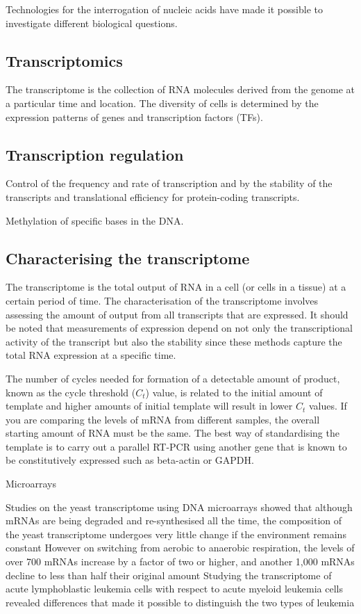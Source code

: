 Technologies for the interrogation of nucleic acids have made it possible to investigate different biological questions.

\subsection{Transcriptomics}

The transcriptome is the collection of RNA molecules derived from the genome at a particular time and location. The diversity of cells is determined by the expression patterns of genes and transcription factors (TFs).

\subsection{Transcription regulation}

Control of the frequency and rate of transcription and by the stability of the transcripts and translational efficiency for protein-coding transcripts.

Methylation of specific bases in the DNA.

\subsection{Characterising the transcriptome}

 The transcriptome is the total output of RNA in a cell (or cells in a tissue) at a certain period of time. The characterisation of the transcriptome involves assessing the amount of output from all transcripts that are expressed. It should be noted that measurements of expression depend on not only the transcriptional activity of the transcript but also the stability since these methods capture the total RNA expression at a specific time.

The number of cycles needed for formation of a detectable amount of product, known as the cycle threshold ($C_{t}$) value, is related to the initial amount of template and higher amounts of initial template will result in lower $C_{t}$ values. If you are comparing the levels of mRNA from different samples, the overall starting amount of RNA must be the same. The best way of standardising the template is to carry out a parallel RT-PCR using another gene that is known to be constitutively expressed such as beta-actin or GAPDH.

Microarrays\cite{pmid7569999}

Studies on the yeast transcriptome using DNA microarrays showed that although mRNAs are being degraded and re-synthesised all the time, the composition of the yeast transcriptome undergoes very little change if the environment remains constant\cite{pmid9381177}
However on switching from aerobic to anaerobic respiration, the levels of over 700 mRNAs increase by a factor of two or higher, and another 1,000 mRNAs decline to less than half their original amount
Studying the transcriptome of acute lymphoblastic leukemia cells with respect to acute myeloid leukemia cells revealed differences that made it possible to distinguish the two types of leukemia

